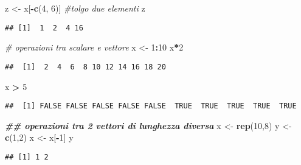 \documentclass[
]{article}
\newenvironment{Shaded}{\begin{snugshade}}{\end{snugshade}}
\newcommand{\CommentTok}[1]{\textcolor[rgb]{0.56,0.35,0.01}{\textit{#1}}}
\newcommand{\DecValTok}[1]{\textcolor[rgb]{0.00,0.00,0.81}{#1}}
\newcommand{\DocumentationTok}[1]{\textcolor[rgb]{0.56,0.35,0.01}{\textbf{\textit{#1}}}}
\newcommand{\FunctionTok}[1]{\textcolor[rgb]{0.13,0.29,0.53}{\textbf{#1}}}
\newcommand{\NormalTok}[1]{#1}
\newcommand{\OtherTok}[1]{\textcolor[rgb]{0.56,0.35,0.01}{#1}}
\newcommand{\SpecialCharTok}[1]{\textcolor[rgb]{0.81,0.36,0.00}{\textbf{#1}}}
\begin{document}
\begin{Shaded}
\begin{Highlighting}[]
\NormalTok{z }\OtherTok{\textless{}{-}}\NormalTok{ x[}\SpecialCharTok{{-}}\FunctionTok{c}\NormalTok{(}\DecValTok{4}\NormalTok{, }\DecValTok{6}\NormalTok{)] }\CommentTok{\#tolgo due elementi}
\NormalTok{z}
\end{Highlighting}
\end{Shaded}

\begin{verbatim}
## [1]  1  2  4 16
\end{verbatim}

\begin{Shaded}
\begin{Highlighting}[]
\CommentTok{\# operazioni tra scalare e vettore}
\NormalTok{x }\OtherTok{\textless{}{-}} \DecValTok{1}\SpecialCharTok{:}\DecValTok{10}
\NormalTok{x}\SpecialCharTok{*}\DecValTok{2}   
\end{Highlighting}
\end{Shaded}

\begin{verbatim}
##  [1]  2  4  6  8 10 12 14 16 18 20
\end{verbatim}

\begin{Shaded}
\begin{Highlighting}[]
\NormalTok{x }\SpecialCharTok{\textgreater{}} \DecValTok{5} 
\end{Highlighting}
\end{Shaded}

\begin{verbatim}
##  [1] FALSE FALSE FALSE FALSE FALSE  TRUE  TRUE  TRUE  TRUE  TRUE
\end{verbatim}

\begin{Shaded}
\begin{Highlighting}[]
\DocumentationTok{\#\# operazioni tra 2 vettori di lunghezza diversa}
\NormalTok{x }\OtherTok{\textless{}{-}} \FunctionTok{rep}\NormalTok{(}\DecValTok{10}\NormalTok{,}\DecValTok{8}\NormalTok{)}
\NormalTok{y }\OtherTok{\textless{}{-}} \FunctionTok{c}\NormalTok{(}\DecValTok{1}\NormalTok{,}\DecValTok{2}\NormalTok{)}
\NormalTok{x }\OtherTok{\textless{}{-}}\NormalTok{ x[}\SpecialCharTok{{-}}\DecValTok{1}\NormalTok{]}
\NormalTok{y}
\end{Highlighting}
\end{Shaded}

\begin{verbatim}
## [1] 1 2
\end{verbatim}
\end{document}
